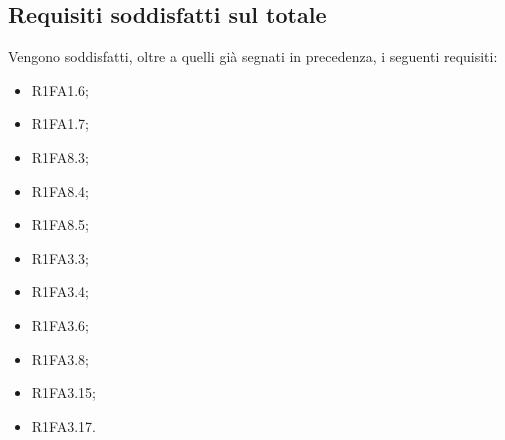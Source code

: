 \subsection{Requisiti soddisfatti sul totale}
Vengono soddisfatti, oltre a quelli già segnati in precedenza, i seguenti requisiti:
\begin{itemize}
	\item R1FA1.6;
	\item R1FA1.7;
	\item R1FA8.3;
	\item R1FA8.4;
	\item R1FA8.5;
	\item R1FA3.3;
	\item R1FA3.4;
	\item R1FA3.6;
	\item R1FA3.8;
	\item R1FA3.15;
	\item R1FA3.17.
\end{itemize}

\clearpage